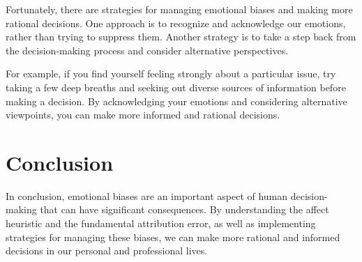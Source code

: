 Fortunately, there are strategies for managing emotional biases and making more rational decisions. One approach is to recognize and acknowledge our emotions, rather than trying to suppress them. Another strategy is to take a step back from the decision-making process and consider alternative perspectives.

For example, if you find yourself feeling strongly about a particular issue, try taking a few deep breaths and seeking out diverse sources of information before making a decision. By acknowledging your emotions and considering alternative viewpoints, you can make more informed and rational decisions.

\section{Conclusion}

In conclusion, emotional biases are an important aspect of human decision-making that can have significant consequences. By understanding the affect heuristic and the fundamental attribution error, as well as implementing strategies for managing these biases, we can make more rational and informed decisions in our personal and professional lives.